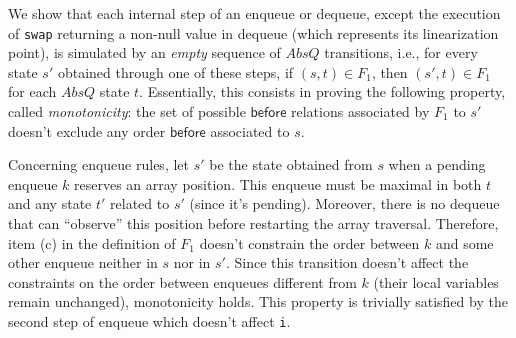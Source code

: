 We show that each internal step of an enqueue or dequeue, except the execution of {\tt swap} returning a non-null value in dequeue (which represents its linearization point), is simulated by an \emph{empty} sequence of $AbsQ$ transitions, i.e., for every state $s'$ obtained through one of these steps, if $(s,t)\in F_1$, then $(s',t)\in F_1$ for each $AbsQ$ state $t$. 
Essentially, this consists in proving the following property, called \emph{monotonicity}: the set of possible $\mathsf{before}$ relations associated by $F_1$ to $s'$ doesn't exclude any order $\mathsf{before}$ associated to $s$.

Concerning enqueue rules, let $s'$ be the state obtained from $s$ when a pending enqueue $k$ reserves an array position. This enqueue must be maximal in both $t$ and any state $t'$ related to $s'$ (since it's pending). Moreover, there is no dequeue that can ``observe'' this position before restarting the array traversal. Therefore, item (c) in the definition of $F_1$ doesn't constrain the order between $k$ and some other enqueue neither in $s$ nor in $s'$. Since this transition doesn't affect the constraints on the order between enqueues different from $k$ (their local variables remain unchanged), monotonicity holds. This property is trivially satisfied by the second step of enqueue which doesn't affect {\tt i}.

